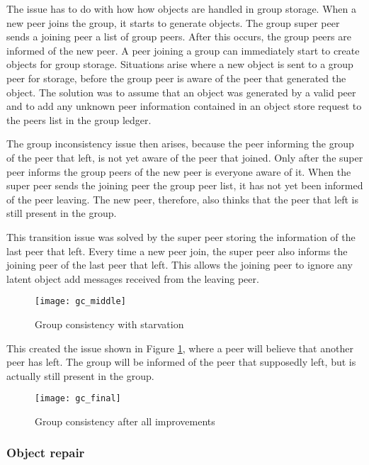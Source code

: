 The issue has to do with how how objects are handled in group storage. When a new peer joins the group, it starts to generate objects. The group super peer sends a joining peer a list of group peers. After this occurs, the group peers are informed of the new peer. A peer joining a group can immediately start to create objects for group storage. Situations arise where a new object is sent to a group peer for storage, before the group peer is aware of the peer that generated the object. The solution was to assume that an object was generated by a valid peer and to add any unknown peer information contained in an object store request to the peers list in the group ledger.

The group inconsistency issue then arises, because the peer informing the group of the peer that left, is not yet aware of the peer that joined. Only after the super peer informs the group peers of the new peer is everyone aware of it. When the super peer sends the joining peer the group peer list, it has not yet been informed of the peer leaving. The new peer, therefore, also thinks that the peer that left is still present in the group.

This transition issue was solved by the super peer storing the information of the last peer that left. Every time a new peer join, the super peer also informs the joining peer of the last peer that left. This allows the joining peer to ignore any latent object add messages received from the leaving peer.

    \begin{figure}[htbp]
 \centering
 \texttt{[image: gc\_middle]}
 \caption{Group consistency with starvation}
 \label{fig_gc_middle}
\end{figure}
%
This created the issue shown in Figure \ref{fig_gc_middle}, where a peer will believe that another peer has left. The group will be informed of the peer that supposedly left, but is actually still present in the group.

    \begin{figure}[htbp]
 \centering
 \texttt{[image: gc\_final]}
 \caption{Group consistency after all improvements}
 \label{fig_gc_final}
\end{figure}

    \subsubsection{Object repair}
    \label{object_repair_implementation}

